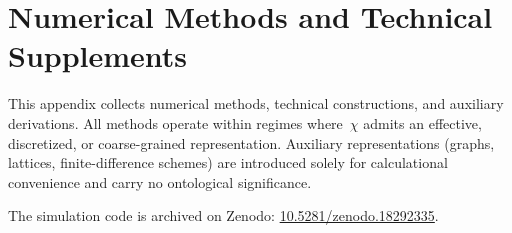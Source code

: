 \clearpage

\section{Numerical Methods and Technical Supplements}
\label{sec:appendix-simulation}

This appendix collects numerical methods, technical constructions, and
auxiliary derivations.
All methods operate within regimes where~$\chi$ admits an effective,
discretized, or coarse-grained representation.
Auxiliary representations (graphs, lattices, finite-difference schemes)
are introduced solely for calculational convenience and carry no
ontological significance.

The simulation code is archived on Zenodo:
\href{https://doi.org/10.5281/zenodo.18292335}%
{10.5281/zenodo.18292335}.















